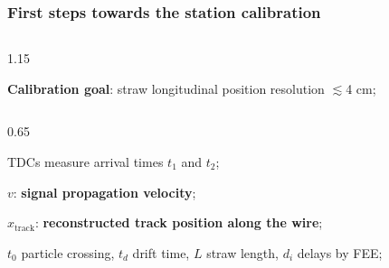 \documentclass{beamer}
\begin{document}
\begin{frame}
    \frametitle{First steps towards the station calibration}
    \vspace{-3mm}
    \begin{columns}
        \begin{column}{1.15\framewidth}
                        \setlength{\leftmargini}{1.2em}
            \begin{itemize}
                {\small    
             \item \textbf{Calibration goal}: straw longitudinal position resolution $\lesssim$4 cm;}
            \end{itemize}
        \end{column}
    \end{columns}
        \vspace{-1.5mm}
    \begin{columns}
        \begin{column}{0.65\framewidth}
                \setlength{\leftmargini}{1.2em}
            \begin{itemize}
             {\small 
             \item TDCs measure arrival times $t_1$ and $t_2$;

                \item $v$: \textbf{signal propagation velocity};
    \item $x_{\text{track}}$: \textbf{reconstructed track position along the wire};
    
                \item $t_0$ particle crossing, $t_d$ drift time, $L$ straw length, $d_i$ delays by FEE;
                                          
}
\end{itemize}
\end{column}
\end{columns}
\end{frame}
\end{document}
